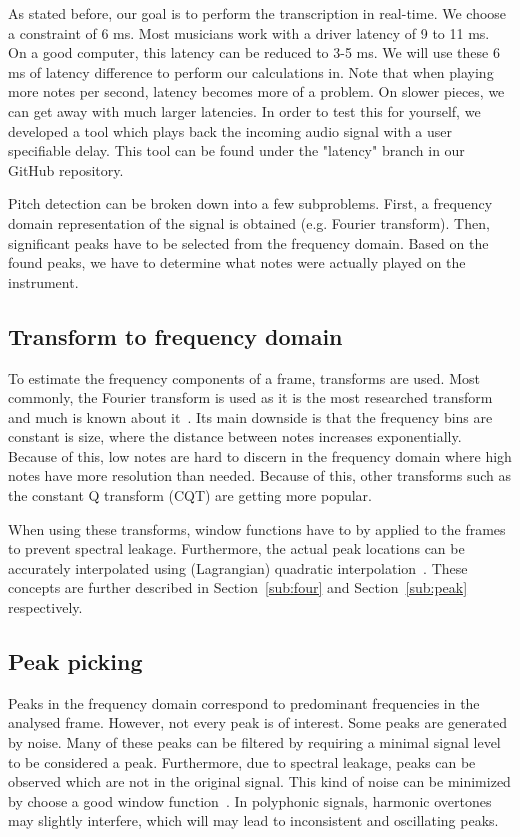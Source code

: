 \documentclass[10pt,twocolumn]{article}
\begin{document}
As stated before, our goal is to perform the transcription in real-time. We choose a constraint of 6 ms. Most musicians work with a driver latency of 9 to 11 ms. On a good computer, this latency can be reduced to 3-5 ms. We will use these 6 ms of latency difference to perform our calculations in. Note that when playing more notes per second, latency becomes more of a problem. On slower pieces, we can get away with much larger latencies. In order to test this for yourself, we developed a tool which plays back the incoming audio signal with a user specifiable delay. This tool can be found under the "latency" branch in our GitHub repository. 

Pitch detection can be broken down into a few subproblems. First, a frequency domain representation of the signal is obtained (e.g. Fourier transform). Then, significant peaks have to be selected from the frequency domain. Based on the found peaks, we have to determine what notes were actually played on the instrument.

\subsection{Transform to frequency domain}
To estimate the frequency components of a frame, transforms are used. Most commonly, the Fourier transform is used as it is the most researched transform and much is known about it~\cite{survey2}. Its main downside is that the frequency bins are constant is size, where the distance between notes increases exponentially. Because of this, low notes are hard to discern in the frequency domain where high notes have more resolution than needed. Because of this, other transforms such as the constant Q transform (CQT) are getting more popular.

When using these transforms, window functions have to by applied to the frames to prevent spectral leakage. Furthermore, the actual peak locations can be accurately interpolated using (Lagrangian) quadratic interpolation~\cite{interpol}. These concepts are further described in Section~\ref{sub:four} and Section~\ref{sub:peak} respectively.

\subsection{Peak picking}
Peaks in the frequency domain correspond to predominant frequencies in the analysed frame. However, not every peak is of interest. Some peaks are generated by noise. Many of these peaks can be filtered by requiring a minimal signal level to be considered a peak. Furthermore, due to spectral leakage, peaks can be observed which are not in the original signal. This kind of noise can be minimized by choose a good window function~\cite{window}. In polyphonic signals, harmonic overtones may slightly interfere, which will may lead to inconsistent and oscillating peaks.  %
\end{document}
